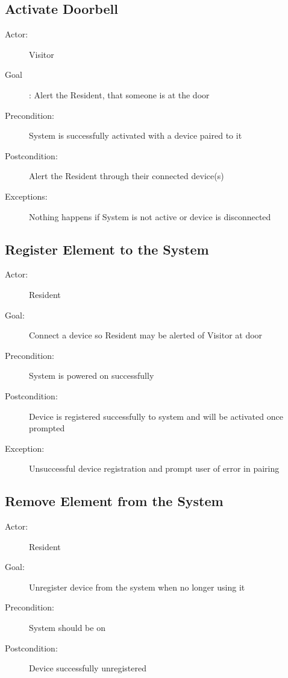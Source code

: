 \subsection{Activate Doorbell}
\begin{description}
\item [Actor:] Visitor
\item [Goal]: Alert the Resident, that someone is at the door
\item [Precondition:] System is successfully activated with a device paired to it
\item [Postcondition:] Alert the Resident through their connected device(s)
\item [Exceptions:] Nothing happens if System is not active or device is disconnected
\end{description}
\subsection{Register Element to the System}
\begin{description}
\item [Actor:] Resident
\item [Goal:] Connect a device so Resident may be alerted of Visitor at door
\item [Precondition:]System is powered on successfully
\item [Postcondition:] Device is registered successfully to system and will be activated once prompted
\item [Exception:] Unsuccessful device registration and prompt user of error in pairing
\end{description}
\subsection{Remove Element from the System}
\begin{description}
\item [Actor:] Resident
\item [Goal:] Unregister device from the system when no longer using it
\item [Precondition:] System should be on
\item [Postcondition:] Device successfully unregistered
\end{description}